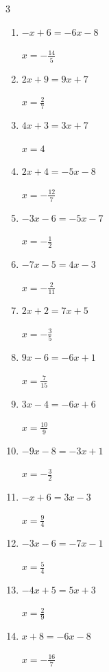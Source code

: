 \begin{multicols}{3}
\begin{enumerate}
        $\displaystyle x=-5$

  \item $-x+6=-6x-8$

        $\displaystyle x=-\frac{14}{5}$

  \item $2x+9=9x+7$

        $\displaystyle x=\frac{2}{7}$

  \item $4x+3=3x+7$

        $\displaystyle x=4$

  \item $2x+4=-5x-8$

        $\displaystyle x=-\frac{12}{7}$

  \item $-3x-6=-5x-7$

        $\displaystyle x=-\frac{1}{2}$

  \item $-7x-5=4x-3$

        $\displaystyle x=-\frac{2}{11}$

  \item $2x+2=7x+5$

        $\displaystyle x=-\frac{3}{5}$

  \item $9x-6=-6x+1$

        $\displaystyle x=\frac{7}{15}$

  \item $3x-4=-6x+6$

        $\displaystyle x=\frac{10}{9}$

  \item $-9x-8=-3x+1$

        $\displaystyle x=-\frac{3}{2}$

  \item $-x+6=3x-3$

        $\displaystyle x=\frac{9}{4}$

\columnbreak %

  \item $-3x-6=-7x-1$

        $\displaystyle x=\frac{5}{4}$

  \item $-4x+5=5x+3$

        $\displaystyle x=\frac{2}{9}$

  \item $x+8=-6x-8$

        $\displaystyle x=-\frac{16}{7}$


\end{enumerate}
\end{multicols}
